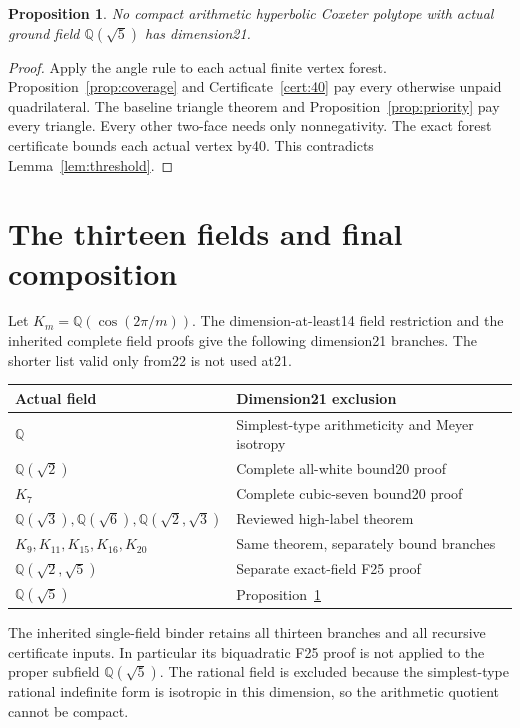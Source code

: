 \documentclass[11pt]{article}
\newtheorem{proposition}[theorem]{Proposition}
\newcommand{\Q}{\mathbb Q}
\begin{document}
\begin{proposition}\label{prop:golden}
No compact arithmetic hyperbolic Coxeter polytope with actual ground field
$\Q(\sqrt5)$ has dimension21.
\end{proposition}
\begin{proof}
Apply the angle rule to each actual finite vertex forest.
Proposition~\ref{prop:coverage} and Certificate~\ref{cert:40} pay every
otherwise unpaid quadrilateral. The baseline triangle theorem and
Proposition~\ref{prop:priority} pay every triangle. Every other two-face
needs only nonnegativity. The exact forest certificate bounds each
actual vertex by40. This contradicts Lemma~\ref{lem:threshold}.
\end{proof}

\section{The thirteen fields and final composition}
Let $K_m=\Q(\cos(2\pi/m))$. The dimension-at-least14 field restriction
\cite{Vinberg,Nikulin}
and the inherited complete field proofs give the following dimension21
branches. The shorter list valid only from22 is not used at21.
\begin{center}
\begin{tabular}{ll}\toprule
Actual field&Dimension21 exclusion\\\midrule
$\Q$&Simplest-type arithmeticity and Meyer isotropy\\
$\Q(\sqrt2)$&Complete all-white bound20 proof\\
$K_7$&Complete cubic-seven bound20 proof\\
$\Q(\sqrt3),\Q(\sqrt6),\Q(\sqrt2,\sqrt3)$&Reviewed high-label theorem\\
$K_9,K_{11},K_{15},K_{16},K_{20}$&Same theorem, separately bound branches\\
$\Q(\sqrt2,\sqrt5)$&Separate exact-field F25 proof\\
$\Q(\sqrt5)$&Proposition~\ref{prop:golden}\\\bottomrule
\end{tabular}
\end{center}
The inherited single-field binder retains all thirteen branches and all
recursive certificate inputs. In particular its biquadratic F25 proof is
not applied to the proper subfield $\Q(\sqrt5)$. The rational field is
excluded because the simplest-type rational indefinite form is isotropic
in this dimension, so the arithmetic quotient cannot be compact.
\end{document}

